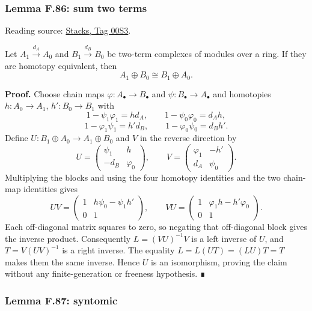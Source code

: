 \documentclass[11pt,a4paper,openany]{report}
\begin{document}
\label{AG-RG-S05-algebra-lemma-sum-two-terms}

\subsubsection{Lemma F.86: sum two terms}\label{AG-RG-S05-lemma-f.86-sum-two-terms}

Reading source: \href{https://stacks.math.columbia.edu/tag/00S3}{Stacks, Tag 00S3}.

Let \(A_1\xrightarrow{d_A}A_0\) and \(B_1\xrightarrow{d_B}B_0\) be two-term complexes of modules over a ring. If they are homotopy equivalent, then \[
A_1\oplus B_0\cong B_1\oplus A_0.
\]

\textbf{Proof.} Choose chain maps \(\varphi:A_\bullet\to B_\bullet\) and \(\psi:B_\bullet\to A_\bullet\) and homotopies \(h:A_0\to A_1\), \(h':B_0\to B_1\) with \[
1-\psi_1\varphi_1=hd_A,\qquad 1-\psi_0\varphi_0=d_Ah,
\] \[
1-\varphi_1\psi_1=h'd_B,\qquad 1-\varphi_0\psi_0=d_Bh'.
\] Define \(U:B_1\oplus A_0\to A_1\oplus B_0\) and \(V\) in the reverse direction by \[
U=\begin{pmatrix}\psi_1&h\\-d_B&\varphi_0\end{pmatrix},\qquad
V=\begin{pmatrix}\varphi_1&-h'\\d_A&\psi_0\end{pmatrix}.
\] Multiplying the blocks and using the four homotopy identities and the two chain-map identities gives \[
UV=\begin{pmatrix}1&h\psi_0-\psi_1h'\\0&1\end{pmatrix},\qquad
VU=\begin{pmatrix}1&\varphi_1h-h'\varphi_0\\0&1\end{pmatrix}.
\] Each off-diagonal matrix squares to zero, so negating that off-diagonal block gives the inverse product. Consequently \(L=(VU)^{-1}V\) is a left inverse of \(U\), and \(T=V(UV)^{-1}\) is a right inverse. The equality \(L=L(UT)=(LU)T=T\) makes them the same inverse. Hence \(U\) is an isomorphism, proving the claim without any finite-generation or freeness hypothesis. ∎

\label{AG-RG-S05-algebra-lemma-syntomic}

\subsubsection{Lemma F.87: syntomic}\label{AG-RG-S05-lemma-f.87-syntomic}
\end{document}
